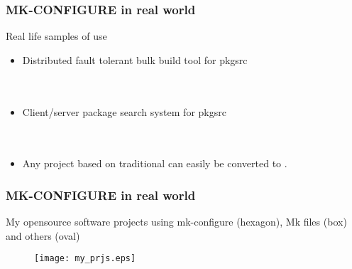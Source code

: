 \documentclass[hyperref={colorlinks=true}]{beamer}
\begin{document}

\begin{frame}[fragile,t]
  \frametitle{MK-CONFIGURE in real world}
  \begin{block}{Real life samples of use}
  \begin{itemize}
  \item Distributed fault tolerant bulk build tool for pkgsrc\\
    \\
    \\
  \item Client/server package search system for pkgsrc\\
    \\
    \\
  \item Any project based on traditional
     can easily be converted
    to .
  \end{itemize}
  \end{block}
\end{frame}



\begin{frame}[fragile,t]
  \frametitle{MK-CONFIGURE in real world}
  \begin{block}{My opensource software projects using
      mk-configure (hexagon), Mk files (box) and others (oval)}
    \begin{figure}
      \texttt{[image: my\_prjs.eps]}
    \end{figure}
  \end{block}
\end{frame}

\end{document}
